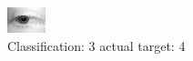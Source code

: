 \begin{figure}[h!]
\begin{center}
\includegraphics[width=0.60\columnwidth]{figures/ID2659_class_3_target_4.png}
\end{center}
\caption{ Classification: 3 actual target: 4}
\label{fig:ID2659_class_3_target_4}
\end{figure}
